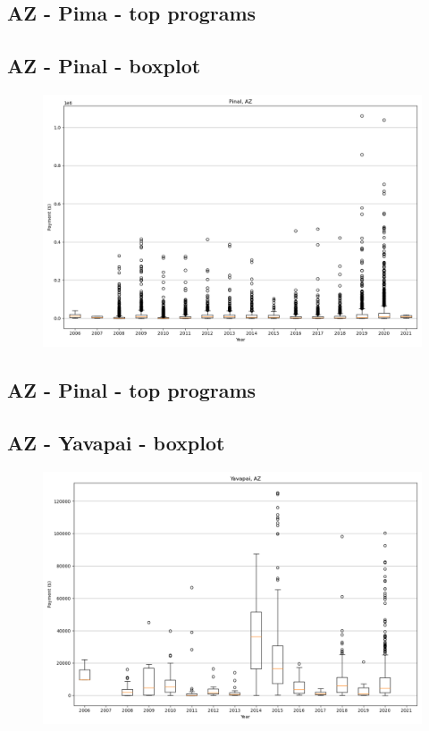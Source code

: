 \subsection*{AZ - Pima - top programs}

\newpage
\subsection*{AZ - Pinal - boxplot}
\begin{figure}[h]
\centering
\includegraphics[width=7in]{../output/boxplots/counties/Pinal-AZ_boxplot.png}
\end{figure}


\subsection*{AZ - Pinal - top programs}

\newpage
\subsection*{AZ - Yavapai - boxplot}
\begin{figure}[h]
\centering
\includegraphics[width=7in]{../output/boxplots/counties/Yavapai-AZ_boxplot.png}
\end{figure}


